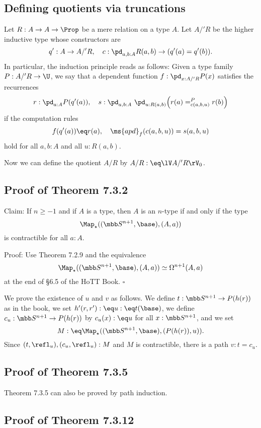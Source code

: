 \documentclass[12pt]{article}
\begin{document}

\subsection{Defining quotients via truncations}\label{qvt}

Let $R:A\to A\to\Prop$ be a mere relation on a type $A$. Let $A/'R$ be the higher inductive type whose constructors are 
$$
q':A\to A/'R,\quad c:\pd_{a,b:A}R(a,b)\to(q'(a)=q'(b)).
$$ 
In particular, the induction principle reads as follows: Given a type family $P:A/'R\to\U$, we say that a dependent function $f:\pd_{x:A/'R}P(x)$ satisfies the recurrences 
$$
r:\pd_{a:A}P(q'(a)),\quad s:\pd_{a,b:A}\ \pd_{u:R(a,b)}\Big(r(a)=^P_{c(a,b,u)}r(b)\Big)
$$ 
if the computation rules 
$$
f(q'(a))\eq r(a),\quad\ms{apd}_f(c(a,b,u))=s(a,b,u)
$$ 
hold for all $a,b:A$ and all $u:R(a,b)$. 

Now we can define the quotient $A/R$ by $A/R:\eq\lV A/'R\rV_0$. 


\subsection{Proof of Theorem 7.3.2}

Claim: If $n\ge-1$ and if $A$ is a type, then $A$ is an $n$-type if and only if the type 
$$
\Map_\star((\mbb S^{n+1},\base),(A,a))
$$ 
is contractible for all $a:A$.

\nn Proof: Use Theorem 7.2.9 and the equivalence 
$$
\Map_\star((\mbb S^{n+1},\base),(A,a))\simeq\Omega^{n+1}(A,a)
$$ 
at the end of \S6.5 of the HoTT Book. $\square$

We prove the existence of $u$ and $v$ as follows. We define $t:\mbb S^{n+1}\to P(h(r))$ as in the book, we set $h'(r,r'):\eq u:\eq t(\base)$, we define $c_u:\mbb S^{n+1}\to P(h(r))$ by $c_u(x):\eq u$ for all $x:\mbb S^{n+1}$, and we set
$$
M:\eq\Map_\star((\mbb S^{n+1},\base),(P(h(r)),u)).
$$ 
Since $(t,\refl_u),(c_u,\refl_u):M$ and $M$ is contractible, there is a path $v:t=c_u$.


\subsection{Proof of Theorem 7.3.5}

Theorem 7.3.5 can also be proved by path induction.


\subsection{Proof of Theorem 7.3.12}
\end{document}
